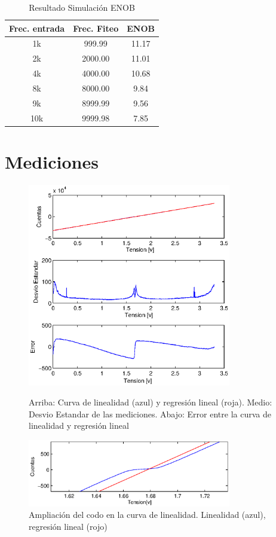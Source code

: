 \documentclass[a4paper,conference]{IEEEtran}
\begin{document}
\begin{table}[!h]
	\renewcommand{\arraystretch}{1.3}
	\caption{Resultado Simulaci\'on ENOB}
	\label{Tabla:sim}
	\centering
	\begin{tabular}{|c|c|c|}
		\hline
		Frec. entrada & Frec. Fiteo & ENOB\\
		\hline
		1k & 999.99 & 11.17\\
		\hline
		2k & 2000.00 & 11.01\\
		\hline
		4k & 4000.00 & 10.68\\
		\hline
		8k & 8000.00 & 9.84\\
		\hline
		9k & 8999.99 & 9.56\\
		\hline
		10k & 9999.98 & 7.85\\
		\hline
	\end{tabular}
\end{table}

\section{Mediciones}

\begin{figure}[!b]
\centering
\includegraphics[width=3.5in]{Linealidad}
\caption{Arriba: Curva de linealidad (azul) y regresión lineal (roja). Medio: Desvio Estandar de las mediciones. Abajo: Error entre la curva de linealidad y regresión lineal}

\label{fig:lin}
	\centering
	\includegraphics[width=3.5in]{Linealidad_codo}
	\caption{Ampliación del codo en la curva de linealidad. Linealidad (azul), regresión lineal (rojo)}
	
	\label{fig:lincodo}
\end{figure}
\end{document}
